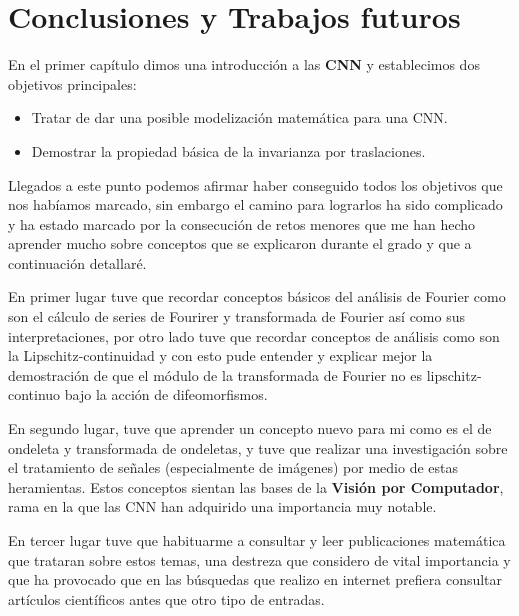 

\chapter{Conclusiones y Trabajos futuros}

\noindent En el primer capítulo dimos una introducción a las \textbf{CNN} y establecimos dos objetivos principales:

\begin{itemize}
  \item Tratar de dar una posible modelización matemática para una CNN.
  \item Demostrar la propiedad básica de la invarianza por traslaciones. 
\end{itemize}

\noindent Llegados a este punto podemos afirmar haber conseguido todos los objetivos que nos habíamos marcado, sin embargo el camino para lograrlos ha sido complicado y ha estado marcado por la consecución de retos menores que me han hecho aprender mucho sobre conceptos que se explicaron durante el grado y que a continuación detallaré. 

\medskip

\noindent En primer lugar tuve que recordar conceptos básicos del análisis de Fourier como son el cálculo de series de Fourirer y transformada de Fourier así como sus interpretaciones, por otro lado tuve que recordar conceptos de análisis como son la Lipschitz-continuidad y con esto pude entender y explicar mejor la demostración de que el módulo de la transformada de Fourier no es lipschitz-continuo bajo la acción de difeomorfismos.

\medskip

\noindent En segundo lugar, tuve que aprender un concepto nuevo para mi como es el de ondeleta y transformada de ondeletas, y tuve que realizar una investigación sobre el tratamiento de señales (especialmente de imágenes) por medio de estas heramientas. Estos conceptos sientan las bases de la \textbf{Visión por Computador}, rama en la que las CNN han adquirido una importancia muy notable.

\medskip

\noindent En tercer lugar tuve que habituarme a consultar y leer publicaciones matemática que trataran sobre estos temas, una destreza que considero de vital importancia y que ha provocado que en las búsquedas que realizo en internet prefiera consultar artículos científicos antes que otro tipo de entradas.

